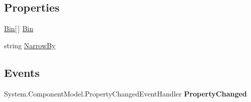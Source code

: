 \subsection*{Properties}
\begin{DoxyCompactItemize}
\item 
\hypertarget{class_price___comparison_1_1amazon_1_1ecs_1_1_search_bin_set_aa731a02f168875e123c3b7692144ea1b}{\hyperlink{class_price___comparison_1_1amazon_1_1ecs_1_1_bin}{Bin}\mbox{[}$\,$\mbox{]} \hyperlink{class_price___comparison_1_1amazon_1_1ecs_1_1_search_bin_set_aa731a02f168875e123c3b7692144ea1b}{Bin}}\label{class_price___comparison_1_1amazon_1_1ecs_1_1_search_bin_set_aa731a02f168875e123c3b7692144ea1b}

\begin{DoxyCompactList}\small\item\em \end{DoxyCompactList}\item 
\hypertarget{class_price___comparison_1_1amazon_1_1ecs_1_1_search_bin_set_affcc45b662f0b8bda0eafdbfbee4e6c8}{string \hyperlink{class_price___comparison_1_1amazon_1_1ecs_1_1_search_bin_set_affcc45b662f0b8bda0eafdbfbee4e6c8}{Narrow\-By}}\label{class_price___comparison_1_1amazon_1_1ecs_1_1_search_bin_set_affcc45b662f0b8bda0eafdbfbee4e6c8}

\begin{DoxyCompactList}\small\item\em \end{DoxyCompactList}\end{DoxyCompactItemize}
\subsection*{Events}
\begin{DoxyCompactItemize}
\item 
\hypertarget{class_price___comparison_1_1amazon_1_1ecs_1_1_search_bin_set_a223ae4201bbf55463bf52334adadf50c}{System.\-Component\-Model.\-Property\-Changed\-Event\-Handler {\bfseries Property\-Changed}}\label{class_price___comparison_1_1amazon_1_1ecs_1_1_search_bin_set_a223ae4201bbf55463bf52334adadf50c}

\end{DoxyCompactItemize}
